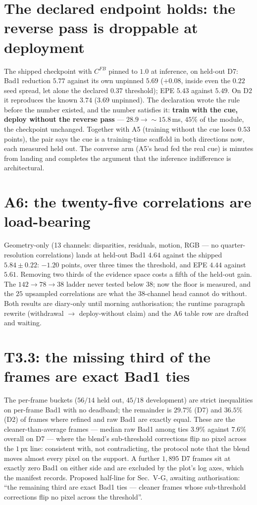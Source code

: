 \documentclass[11pt,a4paper]{article}
\begin{document}
\section*{The declared endpoint holds: the reverse pass is droppable at deployment}

The shipped checkpoint with $C^{FB}$ pinned to $1.0$ at inference, on
held-out D7: Bad1 reduction $5.77$ against its own unpinned $5.69$
($+0.08$, inside even the $0.22$ seed spread, let alone the declared $0.37$
threshold); EPE $5.43$ against $5.49$. On D2 it reproduces the known
$3.74$ ($3.69$ unpinned). The declaration wrote the rule before the number
existed, and the number satisfies it: \textbf{train with the cue, deploy
without the reverse pass} --- $28.9 \to {\sim}15.8$\,ms, $45\%$ of the module,
the checkpoint unchanged. Together with A5 (training without the cue loses
$0.53$ points), the pair says the cue is a training-time scaffold in both
directions now, each measured held out. The converse arm (A5's head fed the
real cue) is minutes from landing and completes the argument that the
inference indifference is architectural.

\section*{A6: the twenty-five correlations are load-bearing}

Geometry-only (13 channels: disparities, residuals, motion, RGB --- no
quarter-resolution correlations) lands at held-out Bad1 $4.64$ against the
shipped $5.84\pm0.22$: $-1.20$ points, over three times the threshold, and
EPE $4.44$ against $5.61$. Removing two thirds of the evidence space costs a
fifth of the held-out gain. The $142 \to 78 \to 38$ ladder never tested below
$38$; now the floor is measured, and the $25$ upsampled correlations are what
the $38$-channel head cannot do without. Both results are diary-only until
morning authorisation; the runtime paragraph rewrite (withdrawal $\to$
deploy-without claim) and the A6 table row are drafted and waiting.



\section*{T3.3: the missing third of the frames are exact Bad1 ties}

The per-frame buckets ($56/14$ held out, $45/18$ development) are strict
inequalities on per-frame Bad1 with no deadband; the remainder is $29.7\%$
(D7) and $36.5\%$ (D2) of frames where refined and raw Bad1 are exactly
equal. These are the cleaner-than-average frames --- median raw Bad1 among
ties $3.9\%$ against $7.6\%$ overall on D7 --- where the blend's
sub-threshold corrections flip no pixel across the $1$\,px line: consistent
with, not contradicting, the protocol note that the blend moves almost every
pixel on the support. A further $1{,}895$ D7 frames sit at exactly zero Bad1
on either side and are excluded by the plot's log axes, which the manifest
records. Proposed half-line for Sec.~V-G, awaiting authorisation: ``the
remaining third are exact Bad1 ties --- cleaner frames whose sub-threshold
corrections flip no pixel across the threshold''.
\end{document}
